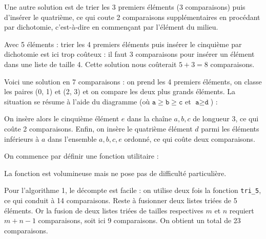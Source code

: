 Une autre solution est de trier les 3 premiers éléments (3 comparaisons) puis d'insérer le quatrième, ce qui coute 2 comparaisons supplémentaires en procédant par dichotomie, c'est-à-dire en commençant par l'élément du milieu.
\medskip

Avec 5 éléments : trier les 4 premiers éléments puis insérer le cinquième par dichotomie est ici trop coûteux : il faut 3 comparaisons pour insérer un élément dans une liste de taille 4. Cette solution nous coûterait $5+3=8$ comparaisons.
\medskip

Voici une solution en 7 comparaisons : on prend les 4 premiers éléments, on classe les paires (0, 1) et (2, 3) et on compare les deux plus grands éléments. La situation se résume à l'aide du diagramme (où $\texttt{a}\geq\texttt{b}\geq\texttt{c}$ et $\texttt{a}\geq\texttt{d}$) :

\begin{center}
\end{center}

On insère alors le cinquième élément $e$ dans la chaîne $a,b,c$ de longueur 3, ce qui coûte 2 comparaisons. Enfin, on insère le quatrième élément $d$ parmi les éléments inférieurs à $a$ dans l'ensemble $a,b,c,e$ ordonné, ce qui coûte deux comparaisons.
\medskip

On commence par définir une fonction utilitaire :



La fonction est volumineuse mais ne pose pas de difficulté particulière.

\Q
Pour l'algorithme 1, le décompte est facile : on utilise deux fois la fonction \texttt{tri\_5}, ce qui conduit à 14 comparaisons. Reste à fusionner deux listes triées de 5 éléments. Or la fusion de deux listes triées de tailles respectives $m$ et $n$ requiert $m+n-1$ comparaisons, soit ici 9 comparaisons. On obtient un total de 23 comparaisons.
\medskip

